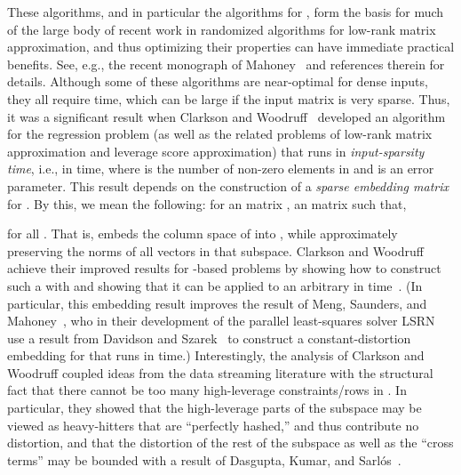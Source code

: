 \documentclass[11pt]{article}
\begin{document}
These algorithms, and in particular the algorithms for , form the basis for
much of the large body of recent work in randomized algorithms for low-rank
matrix approximation, and thus optimizing their properties can have immediate
practical benefits.
See, e.g., the recent monograph of Mahoney~\cite{Mah-mat-rev_BOOK} and
references therein for details.
Although some of these algorithms are near-optimal for dense inputs, they all
require  time, which can be large if the input matrix is 
very sparse.
Thus, it was a significant result when Clarkson and
Woodruff~\cite{CW12sparse_TR} developed an algorithm for the  regression
problem (as well as the related problems of low-rank matrix approximation and
 leverage score approximation) that runs in \emph{input-sparsity time},
i.e., in  time, where  is the
number of non-zero elements in  and  is an error parameter.
This result depends on the construction of a \emph{sparse embedding matrix}
 for .
By this,
we mean the following: 
for an  matrix , an  matrix  such that, 

for all .
That is,  embeds the column space of  into , while approximately
preserving the  norms of all vectors in that subspace.
Clarkson and Woodruff achieve their improved results for -based problems
by showing how to construct such a  with  and showing
that it can be applied to an arbitrary  in 
time~\cite{CW12sparse_TR}.
(In particular, this embedding result improves the result of Meng, Saunders, and
Mahoney~\cite{MSM11_TR}, who in their development of the parallel least-squares
solver \textsc{LSRN} use a result from Davidson and
Szarek~\cite{davidson2001local} to construct a constant-distortion embedding for
 that runs in  time.)
Interestingly, the analysis of Clarkson and Woodruff coupled ideas from the data
streaming literature with the structural fact that there cannot be too many
high-leverage constraints/rows in .
In particular, they showed that the high-leverage parts of the subspace may be
viewed as heavy-hitters that are ``perfectly hashed,'' and thus contribute no
distortion, and that the distortion of the rest of the subspace as well as the
``cross terms'' may be bounded with a result of Dasgupta, Kumar, and
Sarl\'{o}s~\cite{DKT10}.
\end{document}
